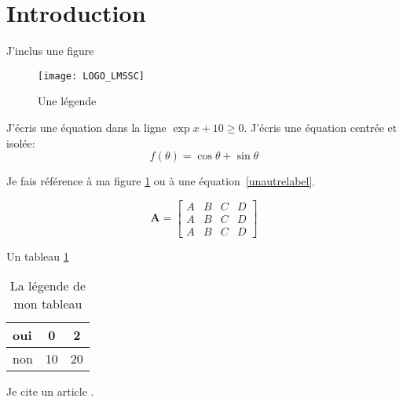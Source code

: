 \section{Introduction}

J'inclus une figure
\begin{figure}[htp!]
\centering
\texttt{[image: LOGO\_LMSSC]}
\caption{Une légende}
\label{unlabel}
\end{figure}


J'écris une équation dans la ligne \(\exp x+10\geq0\).
J'écris une équation centrée et isolée:
\begin{equation}
	f(\theta)=\cos\theta+\sin\theta
	\label{unautrelabel}
\end{equation}

Je fais référence à ma figure \ref{unlabel} ou à une équation~\ref{unautrelabel}.

\begin{equation}
    \mathbf{A}=\begin{bmatrix}
        A&B&C&D\\
        A&B&C&D\\
        A&B&C&D
    \end{bmatrix}
    \label{encoreunlabel}
\end{equation}

Un tableau \ref{labeldemontableau}
\begin{table}[htp]
    \centering
    \begin{tabular}{l|c|c}
        oui&0&2\\\hline
        non&10&20
    \end{tabular}
    \caption{La légende de mon tableau}
    \label{labeldemontableau}
\end{table}

Je cite un article \cite{AAC08a}.